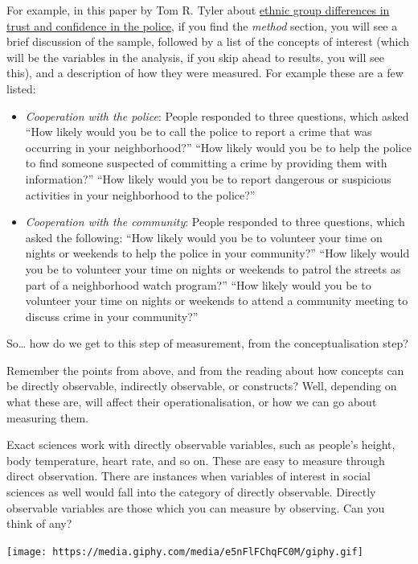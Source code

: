 \documentclass[
]{book}
\providecommand{\tightlist}{%
  \setlength{\itemsep}{0pt}\setlength{\parskip}{0pt}}
\begin{document}
For example, in this paper by Tom R. Tyler about \href{http://journals.sagepub.com/doi/abs/10.1177/1098611104271105}{ethnic group differences in trust and confidence in the police}, if you find the \emph{method} section, you will see a brief discussion of the sample, followed by a list of the concepts of interest (which will be the variables in the analysis, if you skip ahead to results, you will see this), and a description of how they were measured. For example these are a few listed:

\begin{itemize}
\tightlist
\item
  \emph{Cooperation with the police}: People responded to three questions, which asked ``How likely would you be to call the police to report a crime that was occurring in your neighborhood?'' ``How likely would you be to help the police to find someone suspected of committing a crime by providing them with information?'' ``How likely would you be to report dangerous or suspicious activities in your neighborhood to the police?''
\item
  \emph{Cooperation with the community}: People responded to three questions, which asked the following: ``How likely would you be to volunteer your time on nights or weekends to help the police in your community?'' ``How likely would you be to volunteer your time on nights or weekends to patrol the streets as part of a neighborhood watch program?'' ``How likely would you be to volunteer your time on nights or weekends to attend a community meeting to discuss crime in your community?''
\end{itemize}

So\ldots{} how do we get to this step of measurement, from the conceptualisation step?

Remember the points from above, and from the reading about how concepts can be directly observable, indirectly observable, or constructs? Well, depending on what these are, will affect their operationalisation, or how we can go about measuring them.

Exact sciences work with directly observable variables, such as people's height, body temperature, heart rate, and so on. These are easy to measure through direct observation. There are instances when variables of interest in social sciences as well would fall into the category of directly observable. Directly observable variables are those which you can measure by observing. Can you think of any?

\texttt{[image: https://media.giphy.com/media/e5nFlFChqFC0M/giphy.gif]}
\end{document}
